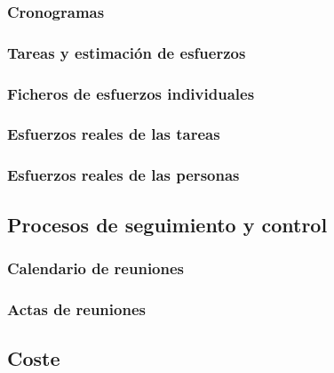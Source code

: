 \documentclass[10pt,spanish]{article}
\begin{document}
\subsubsection{Cronogramas}

\blindtext
\subsubsection{Tareas y estimación de esfuerzos}

\blindtext
\subsubsection{Ficheros de esfuerzos individuales}

\blindtext
\subsubsection{Esfuerzos reales de las tareas}

\blindtext
\subsubsection{Esfuerzos reales de las personas}

\blindtext
\subsection{Procesos de seguimiento y control}

\blindtext
\subsubsection{Calendario de reuniones}

\blindtext
\subsubsection{Actas de reuniones}

\blindtext
\subsection{Coste}

\blindtext
\end{document}

